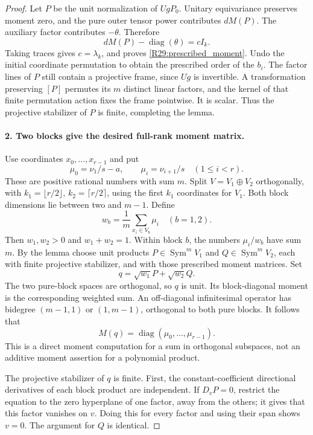 \begin{proof}
Let $P$ be the unit normalization of $UgP_0$.
Unitary equivariance preserves moment zero, and the pure
outer tensor power contributes $dM(P)$. The auxiliary
factor contributes $-\theta$. Therefore
\[
 dM(P)-\operatorname{diag}(\theta)
           =cI_k.
\]
Taking traces gives $c=\lambda_k$, and proves
\eqref{R29:prescribed_moment}. Undo the initial coordinate
permutation to obtain the prescribed order of the $b_i$.
The factor lines of $P$ still contain a projective frame,
since $Ug$ is invertible. A transformation preserving
$[P]$ permutes its $m$ distinct linear factors, and the
kernel of that finite permutation action fixes the frame
pointwise. It is scalar. Thus the projective stabilizer
of $P$ is finite, completing the lemma.

\paragraph{2. Two blocks give the desired full-rank moment matrix.}
Use coordinates $x_0,\ldots,x_{r-1}$ and put
\[
 \mu_0=\nu_1/s-a,\qquad
 \mu_i=\nu_{i+1}/s\quad(1\leq i<r).
\]
These are positive rational numbers with sum $m$.
Split $V=V_1\oplus V_2$ orthogonally, with
$k_1=\lfloor r/2\rfloor$, $k_2=\lceil r/2\rceil$,
using the first $k_1$ coordinates for $V_1$.
Both block dimensions lie between two and $m-1$.
Define
\[
 w_b=\frac1m\sum_{x_i\in V_b}\mu_i\quad(b=1,2).
\]
Then $w_1,w_2>0$ and $w_1+w_2=1$. Within block $b$,
the numbers $\mu_i/w_b$ have sum $m$. By the lemma choose
unit products $P\in\operatorname{Sym}^mV_1$ and
$Q\in\operatorname{Sym}^mV_2$, each with finite projective
stabilizer, and with those prescribed moment matrices.
Set
\begin{equation}\label{R29:two_block_q}
 q=\sqrt{w_1}P+\sqrt{w_2}Q.
\end{equation}
The two pure-block spaces are orthogonal, so $q$ is unit.
Its block-diagonal moment is the corresponding weighted
sum. An off-diagonal infinitesimal operator has bidegree
$(m-1,1)$ or $(1,m-1)$, orthogonal to both pure blocks.
It follows that
\begin{equation}\label{R29:full_moment}
 M(q)=\operatorname{diag}(\mu_0,\ldots,\mu_{r-1}).
\end{equation}
This is a direct moment computation for a sum in orthogonal
subspaces, not an additive moment assertion for a polynomial
product.

The projective stabilizer of $q$ is finite. First, the
constant-coefficient directional derivatives of each block
product are independent. If $D_vP=0$, restrict the equation
to the zero hyperplane of one factor, away from the others;
it gives that this factor vanishes on $v$. Doing this for
every factor and using their span shows $v=0$.
The argument for $Q$ is identical.


\end{proof}
